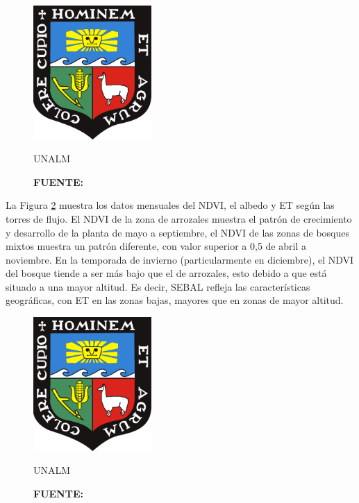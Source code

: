 \begin{figure}[H]
    \centering
    \includegraphics[width=0.4\textwidth]{Cover/Escudo_UNALM.pdf}
    \caption{UNALM}
    \captionsetup{labelfont=rm,skip=2pt,textfont=rm,font=small}
        \caption*{\textbf{FUENTE:} \parencite{Lee2016}}
    \label{fig:4}
\end{figure}
\vspace{-0.6cm}
La Figura \ref{fig:5} muestra los datos mensuales del NDVI, el albedo y  ET según las torres de flujo. El NDVI de la zona de arrozales muestra el patrón de crecimiento y desarrollo de la planta de mayo a septiembre, el NDVI de las zonas de bosques mixtos muestra un patrón diferente, con valor superior a 0,5 de abril a noviembre. En la temporada de invierno (particularmente en diciembre), el NDVI del bosque tiende a ser más bajo que el de arrozales, esto debido a que está situado a una mayor altitud. Es decir, SEBAL refleja las características geográficas, con  ET en las zonas bajas, mayores que en zonas de mayor altitud.

\begin{figure}[H]
    \centering
    \includegraphics[width=0.4\textwidth]{Cover/Escudo_UNALM.pdf}
    \caption{UNALM}
    \captionsetup{labelfont=rm,skip=2pt,textfont=rm,font=small}
        \caption*{\textbf{FUENTE:} \parencite{Lee2016}}
    \label{fig:5}
\end{figure}
\vspace{-0.6cm}
\lipsum[3]

